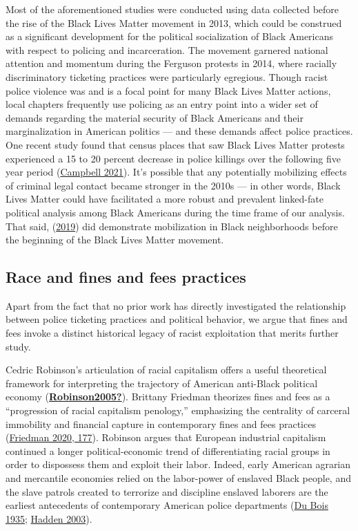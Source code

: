 \documentclass[
  12pt,
]{article}
\begin{document}
Most of the aforementioned studies were conducted using data collected before the rise of the Black Lives Matter movement in 2013, which could be construed as a significant development for the political socialization of Black Americans with respect to policing and incarceration. The movement garnered national attention and momentum during the Ferguson protests in 2014, where racially discriminatory ticketing practices were particularly egregious. Though racist police violence was and is a focal point for many Black Lives Matter actions, local chapters frequently use policing as an entry point into a wider set of demands regarding the material security of Black Americans and their marginalization in American politics --- and these demands affect police practices. One recent study found that census places that saw Black Lives Matter protests experienced a 15 to 20 percent decrease in police killings over the following five year period (\protect\hyperlink{ref-Campbell2021}{Campbell 2021}). It's possible that any potentially mobilizing effects of criminal legal contact became stronger in the 2010s --- in other words, Black Lives Matter could have facilitated a more robust and prevalent linked-fate political analysis among Black Americans during the time frame of our analysis. That said, (\protect\hyperlink{ref-Laniyonu2019}{2019}) did demonstrate mobilization in Black neighborhoods before the beginning of the Black Lives Matter movement.

\hypertarget{race-and-fines-and-fees-practices}{%
\subsection*{Race and fines and fees practices}\label{race-and-fines-and-fees-practices}}

Apart from the fact that no prior work has directly investigated the relationship between police ticketing practices and political behavior, we argue that fines and fees invoke a distinct historical legacy of racist exploitation that merits further study.

Cedric Robinson's articulation of racial capitalism offers a useful theoretical framework for interpreting the trajectory of American anti-Black political economy (\protect\hyperlink{ref-Robinson2005}{\textbf{Robinson2005?}}). Brittany Friedman theorizes fines and fees as a ``progression of racial capitalism penology,'' emphasizing the centrality of carceral immobility and financial capture in contemporary fines and fees practices (\protect\hyperlink{ref-Friedman2020}{Friedman 2020, 177}). Robinson argues that European industrial capitalism continued a longer political-economic trend of differentiating racial groups in order to dispossess them and exploit their labor. Indeed, early American agrarian and mercantile economies relied on the labor-power of enslaved Black people, and the slave patrols created to terrorize and discipline enslaved laborers are the earliest antecedents of contemporary American police departments (\protect\hyperlink{ref-DuBois1935}{Du Bois 1935}; \protect\hyperlink{ref-Hadden2003}{Hadden 2003}).
\end{document}
